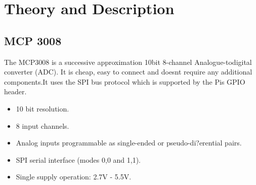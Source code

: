 \documentclass[11pt,a4paper]{article}
\begin{document}
	\section{Theory and Description}
	
\subsection{MCP 3008}
    
The MCP3008 is a successive approximation 10bit 8-channel Analogue-todigital converter (ADC). It is cheap, easy to connect and doesnt require any additional components.It uses the SPI bus protocol which is supported by the Pis GPIO header.
\begin{itemize}
\item  10 bit resolution.
\item 8 input channels.
\item  Analog inputs programmable as single-ended or pseudo-di?erential pairs. 
\item SPI serial interface (modes 0,0 and 1,1).
\item Single supply operation: 2.7V - 5.5V.
\end{itemize}
\end{document}
